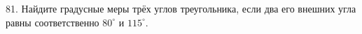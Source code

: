 81. Найдите градусные меры трёх углов треугольника, если два его внешних угла равны соответственно $80^\circ$ и $115^\circ.$\\

